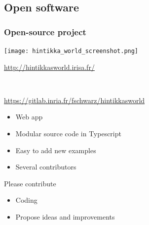 \newcommand{\screenshotandformula}[3]{
	
	\begin{center}
		#3
		
		
		\hspace{2mm}	\texttt{[image: images/\#1]}
		
		#2
		
		
	\end{center}
	
}






\subsection{Open software}



\begin{frame}
	\frametitle{Open-source project}
	
	
	\begin{minipage}{6cm}
		\begin{center}
			
			\texttt{[image: hintikka\_world\_screenshot.png]}
			
			\url{http://hintikkasworld.irisa.fr/}
			
			~
			
			
			\url{https://gitlab.inria.fr/fschwarz/hintikkasworld}
			
			
		\end{center}
	\end{minipage}
	\hfill
	\begin{minipage}{4cm}
		\begin{itemize}
			\item Web app
			\item Modular source code in Typescript
			
			\item Easy to add new examples
			\item Several contributors
			
			
			
			
		\end{itemize}
		
		
		
		\begin{block}{Please contribute}
			\begin{itemize}
				\item Coding
				\item Propose ideas and improvements
			\end{itemize}
		\end{block}
	\end{minipage}
\end{frame}







